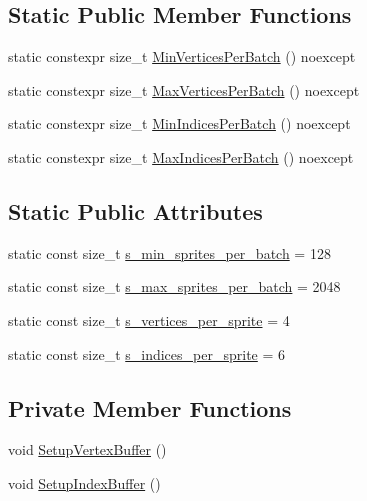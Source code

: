\subsection*{Static Public Member Functions}
\begin{DoxyCompactItemize}
\item 
static constexpr size\+\_\+t \hyperlink{classmage_1_1_sprite_batch_mesh_a489cec36c8cee8ece130b2c22597c711}{Min\+Vertices\+Per\+Batch} () noexcept
\item 
static constexpr size\+\_\+t \hyperlink{classmage_1_1_sprite_batch_mesh_a63c6b47e82be3175891ceb41847ed64d}{Max\+Vertices\+Per\+Batch} () noexcept
\item 
static constexpr size\+\_\+t \hyperlink{classmage_1_1_sprite_batch_mesh_af97c5b660417a70f9a0365c74279ef3e}{Min\+Indices\+Per\+Batch} () noexcept
\item 
static constexpr size\+\_\+t \hyperlink{classmage_1_1_sprite_batch_mesh_a3c4aa8a1c0d5055e3e9b2290b2957bba}{Max\+Indices\+Per\+Batch} () noexcept
\end{DoxyCompactItemize}
\subsection*{Static Public Attributes}
\begin{DoxyCompactItemize}
\item 
static const size\+\_\+t \hyperlink{classmage_1_1_sprite_batch_mesh_accc52fa93a3c7d42e2d4db54c1211d5d}{s\+\_\+min\+\_\+sprites\+\_\+per\+\_\+batch} = 128
\item 
static const size\+\_\+t \hyperlink{classmage_1_1_sprite_batch_mesh_aa4c18beb1d7355a184ac3c93c6a254e3}{s\+\_\+max\+\_\+sprites\+\_\+per\+\_\+batch} = 2048
\item 
static const size\+\_\+t \hyperlink{classmage_1_1_sprite_batch_mesh_a089a9cf9b57f43274bb2542b3c30dd55}{s\+\_\+vertices\+\_\+per\+\_\+sprite} = 4
\item 
static const size\+\_\+t \hyperlink{classmage_1_1_sprite_batch_mesh_a9560987925304ec757cac212d8b921f5}{s\+\_\+indices\+\_\+per\+\_\+sprite} = 6
\end{DoxyCompactItemize}
\subsection*{Private Member Functions}
\begin{DoxyCompactItemize}
\item 
void \hyperlink{classmage_1_1_sprite_batch_mesh_ad3b68ac00e3dfb09ed495ce66f1d6fda}{Setup\+Vertex\+Buffer} ()
\item 
void \hyperlink{classmage_1_1_sprite_batch_mesh_a628ab5a3dd2df0c624b7dc99bcff7f98}{Setup\+Index\+Buffer} ()
\end{DoxyCompactItemize}
